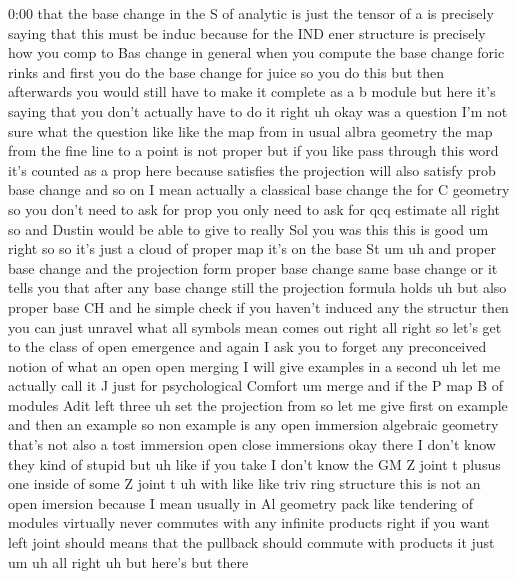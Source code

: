 \begin{unfinished}{0:00}
that  the  base  change  in  the  S  of
analytic  is  just  the  tensor  of  a  is
precisely  saying  that  this  must  be
induc  because  for  the  IND  ener  structure
is  precisely  how  you  comp  to  Bas
change  in  general  when  you  compute  the
base  change  foric  rinks  and  first  you  do
the  base  change  for  juice  so  you  do  this
but  then  afterwards  you  would  still  have
to  make  it  complete  as  a  b  module  but
here  it's  saying  that  you  don't  actually
have  to  do
it
right  uh
okay  was  a
question  I'm  not  sure  what  the  question
like
like  the  map  from  in  usual  albra
geometry  the  map  from  the  fine  line  to  a
point  is  not  proper  but  if  you  like  pass
through  this  word  it's  counted  as  a  prop
here  because  satisfies  the  projection
will  also  satisfy  prob  base  change  and
so  on  I  mean  actually  a  classical  base
change  the  for  C  geometry  so  you  don't
need  to  ask  for  prop  you  only  need  to
ask  for  qcq
estimate  all  right
so  and  Dustin  would  be  able  to  give  to
really  Sol  you  was  this  this  is
good
um  right  so
so  it's  just  a  cloud  of  proper
map  it's  on  the  base  St
um  uh  and  proper  base  change  and  the
projection  form  proper  base
change  same  base  change  or  it  tells  you
that  after  any  base  change  still  the
projection  formula  holds  uh  but  also
proper  base
CH
and
he  simple
check  if  you  haven't  induced  any  the
structur  then  you  can  just  unravel  what
all  symbols
mean  comes  out
right
all  right  so  let's  get  to  the  class  of
open  emergence  and  again  I  ask  you  to
forget  any  preconceived  notion  of  what
an
open
open
merging  I  will  give  examples  in  a  second
uh  let  me  actually  call  it  J  just  for
psychological  Comfort  um  merge  and
if  the  P  map  B  of  modules  Adit
left  three  uh  set  the  projection
from
so  let  me  give  first  on  example  and  then
an  example  so  non
example  is  any  open  immersion  algebraic
geometry  that's  not  also  a  tost
immersion
open  close  immersions  okay  there  I  don't
know  they  kind  of  stupid  but  uh  like  if
you  take  I  don't
know  the  GM  Z  joint  t  plusus  one  inside
of  some  Z  joint  t  uh  with  like  like  triv
ring  structure  this  is  not  an  open
imersion  because  I  mean  usually  in  Al
geometry  pack  like  tendering  of  modules
virtually  never  commutes  with  any
infinite  products  right  if  you  want  left
joint  should  means  that  the  pullback
should  commute  with  products  it
just
um  uh  all  right  uh  but  here's  but  there

\end{unfinished}
